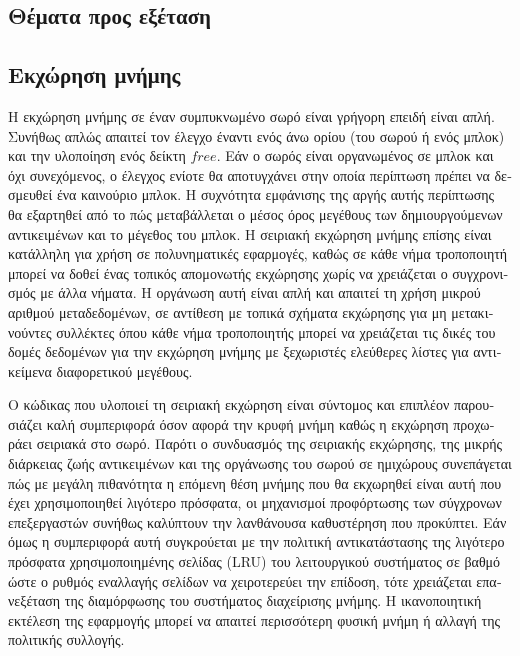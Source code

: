 \begin{greek}
\section{Θέματα προς εξέταση}
\subsection{Εκχώρηση μνήμης}
Η εκχώρηση μνήμης σε έναν συμπυκνωμένο σωρό είναι γρήγορη επειδή
είναι απλή. Συνήθως απλώς απαιτεί τον έλεγχο έναντι ενός άνω 
ορίου (του σωρού ή ενός μπλοκ) και την υλοποίηση ενός δείκτη 
$free$. Εάν ο σωρός είναι οργανωμένος σε μπλοκ και όχι συνεχόμενος,
ο έλεγχος ενίοτε θα αποτυγχάνει στην οποία περίπτωση πρέπει να
δεσμευθεί ένα καινούριο μπλοκ. Η συχνότητα εμφάνισης της αργής
αυτής περίπτωσης θα εξαρτηθεί από το πώς μεταβάλλεται ο μέσος 
όρος μεγέθους των δημιουργούμενων αντικειμένων και το μέγεθος 
του μπλοκ. Η σειριακή εκχώρηση μνήμης επίσης είναι κατάλληλη
για χρήση σε πολυνηματικές εφαρμογές, καθώς σε κάθε νήμα τροποποιητή
μπορεί να δοθεί ένας τοπικός απομονωτής εκχώρησης χωρίς να
χρειάζεται ο συγχρονισμός με άλλα νήματα. Η οργάνωση αυτή είναι
απλή και απαιτεί τη χρήση μικρού αριθμού μεταδεδομένων, σε αντίθεση
με τοπικά σχήματα εκχώρησης για μη μετακινούντες συλλέκτες όπου
κάθε νήμα τροποποιητής μπορεί να χρειάζεται τις δικές του δομές
δεδομένων για την εκχώρηση μνήμης με ξεχωριστές ελεύθερες λίστες 
για αντικείμενα διαφορετικού μεγέθους.

Ο κώδικας που υλοποιεί τη σειριακή εκχώρηση είναι σύντομος 
και επιπλέον παρουσιάζει καλή συμπεριφορά όσον αφορά την κρυφή
μνήμη καθώς η εκχώρηση προχωράει σειριακά στο σωρό. Παρότι ο
συνδυασμός της σειριακής εκχώρησης, της μικρής διάρκειας ζωής
αντικειμένων και της οργάνωσης του σωρού σε ημιχώρους συνεπάγεται
πώς με μεγάλη πιθανότητα η επόμενη θέση μνήμης που θα εκχωρηθεί
είναι αυτή που έχει χρησιμοποιηθεί λιγότερο πρόσφατα, οι μηχανισμοί
προφόρτωσης των σύγχρονων επεξεργαστών συνήθως καλύπτουν την
λανθάνουσα καθυστέρηση που προκύπτει. Εάν όμως η συμπεριφορά
αυτή συγκρούεται με την πολιτική αντικατάστασης της λιγότερο 
πρόσφατα χρησιμοποιημένης σελίδας (LRU) του λειτουργικού
συστήματος σε βαθμό ώστε ο ρυθμός εναλλαγής σελίδων να χειροτερεύει
την επίδοση, τότε χρειάζεται επανεξέταση της διαμόρφωσης του
συστήματος διαχείρισης μνήμης. Η ικανοποιητική εκτέλεση της
εφαρμογής μπορεί να απαιτεί περισσότερη φυσική μνήμη ή αλλαγή
της πολιτικής συλλογής.


\end{greek}
